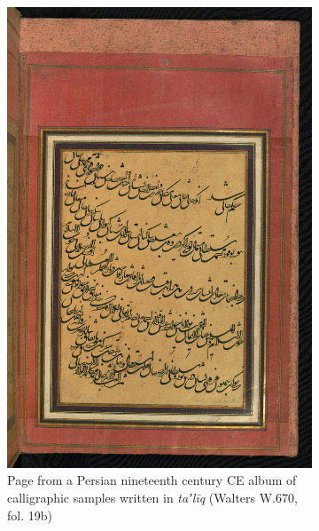 \begin{figure}[h!tp]
        \centering
	\begin{subfigure}[t]{.48\columnwidth}
                \includegraphics[width=\textwidth]{images/W670_000040_sap.jpg}
		\caption{Page from a Persian nineteenth century CE album of calligraphic samples written in \emph{taʼlīq} (Walters W.670, fol. 19b)}
                \label{fig:ara_taliq}
        \end{subfigure}
	\hfill
	\begin{subfigure}[t]{.48\columnwidth}

\end{subfigure}
\end{figure}
